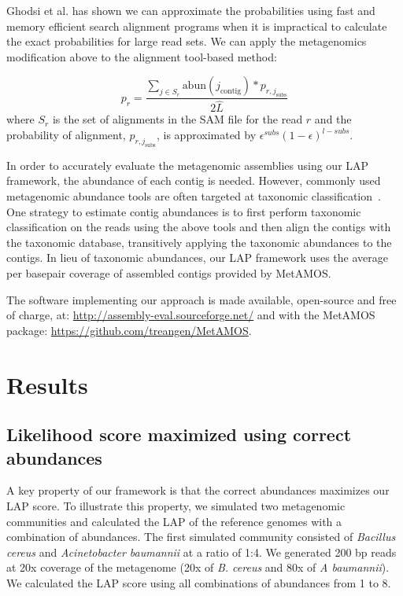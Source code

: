 \documentclass[conference]{IEEEtran}
\begin{document}
Ghodsi et al. has shown we can approximate the probabilities using fast and memory efficient search alignment programs when it is impractical to calculate the exact probabilities for large read sets.
We can apply the metagenomics modification above to the alignment tool-based method:

\begin{equation}
\label{}
p_{r} = \frac{\sum_{j \in S_r} \text{abun}(j_{\text{contig}})*p_{r,j_{\text{subs}}}}{2\hat{L}}
\end{equation}
where $S_r$ is the set of alignments in the SAM file for the read $r$ and the probability of alignment, $p_{r,j_{\text{subs}}}$, is approximated by $\epsilon^{subs}(1 - \epsilon)^{l - subs}$.

In order to accurately evaluate the metagenomic assemblies using our LAP framework, the abundance of each contig is needed.
However, commonly used metagenomic abundance tools are often targeted at taxonomic classification~\cite{segata2012metagenomic,brady2009phymm,liu2010metaphyler,huson2007megan}.
One strategy to estimate contig abundances is to first perform taxonomic classification on the reads using the above tools and then align the contigs with the taxonomic database, transitively applying the taxonomic abundances to the contigs.
In lieu of taxonomic abundances, our LAP framework uses the average per basepair coverage of assembled contigs provided by MetAMOS.

The software implementing our approach is made available, open-source and free of charge, at: \url{http://assembly-eval.sourceforge.net/} and with the MetAMOS package: \url{https://github.com/treangen/MetAMOS}.

\section{Results}
\subsection{Likelihood score maximized using correct abundances}
A key property of our framework is that the correct abundances maximizes our LAP score.
To illustrate this property, we simulated two metagenomic communities and calculated the LAP of the reference genomes with a combination of abundances.
The first simulated community consisted of \emph{Bacillus cereus} and \emph{Acinetobacter baumannii} at a ratio of 1:4.
We generated 200 bp reads at 20x coverage of the metagenome (20x of \emph{B. cereus} and 80x of \emph{A baumannii}).
We calculated the LAP score using all combinations of abundances from 1 to 8.
\end{document}
